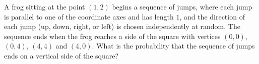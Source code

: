 A frog sitting at the point $(1,2)$ begins a sequence of jumps, where each jump is parallel to one of the coordinate axes and has length $1$, and the direction of each jump (up, down, right, or left) is chosen independently at random. The sequence ends when the frog reaches a side of the square with vertices $(0,0)$, $(0,4)$, $(4,4)$ and $(4,0)$. What is the probability that the sequence of jumps ends on a vertical side of the square?
